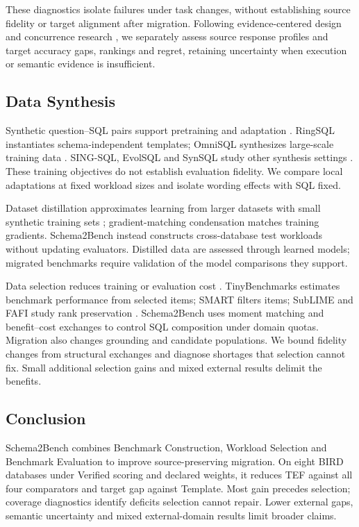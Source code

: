 These diagnostics isolate failures under task changes, without establishing source fidelity or target alignment after migration. Following evidence-centered design and concurrence research \citep{liu2024ecbd,sun2023concurrence,kovatchev2024benchmark}, we separately assess source response profiles and target accuracy gaps, rankings and regret, retaining uncertainty when execution or semantic evidence is insufficient.

\subsection{Data Synthesis}
Synthetic question--SQL pairs support pretraining and adaptation \citep{yu2021grappa,li2021semiautomatic,lent2021canonical}. RingSQL instantiates schema-independent templates; OmniSQL synthesizes large-scale training data \citep{sterbentz2026ringsql,li2025omnisql}. SING-SQL, EvolSQL and SynSQL study other synthesis settings \citep{caferoglu2025singsql,pan2026evolsql,habibollah2026synsql}. These training objectives do not establish evaluation fidelity. We compare local adaptations at fixed workload sizes and isolate wording effects with SQL fixed.

Dataset distillation approximates learning from larger datasets with small synthetic training sets \citep{wang2018distillation,zhao2021condensation}; gradient-matching condensation matches training gradients. Schema2Bench instead constructs cross-database test workloads without updating evaluators. Distilled data are assessed through learned models; migrated benchmarks require validation of the model comparisons they support.

Data selection reduces training or evaluation cost \citep{xie2023dsir,albalak2024dataselection,perlitz2024efficient}. TinyBenchmarks estimates benchmark performance from selected items; SMART filters items; SubLIME and FAFI study rank preservation \citep{maiapolo2024tiny,gupta2025smart,saranathan2025sublime,gusev2026ranking}. Schema2Bench uses moment matching and benefit--cost exchanges \citep{bach2012herding,derezinski2019minimax,khuller1999budgeted} to control SQL composition under domain quotas. Migration also changes grounding and candidate populations. We bound fidelity changes from structural exchanges and diagnose shortages that selection cannot fix. Small additional selection gains and mixed external results delimit the benefits.

\FloatBarrier
\begin{samepage}
\section{Conclusion}
Schema2Bench combines Benchmark Construction, Workload Selection and Benchmark Evaluation to improve source-preserving migration. On eight BIRD databases under Verified scoring and declared weights, it reduces TEF against all four comparators and target gap against Template. Most gain precedes selection; coverage diagnostics identify deficits selection cannot repair. Lower external gaps, semantic uncertainty and mixed external-domain results limit broader claims.

\label{closure:main-end}
\end{samepage}
